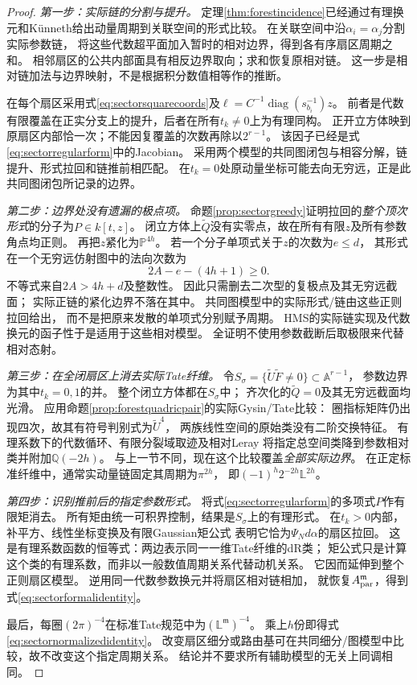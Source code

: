 \documentclass[11pt,a4paper]{ctexart}
\theoremstyle{cnplain}\newtheorem{theorem}{定理}[section]
\theoremstyle{definition}\newtheorem{definition}[theorem]{定义}
\theoremstyle{remark}\newtheorem{remark}[theorem]{注}
\begin{document}
\begin{proof}
\emph{第一步：实际链的分割与提升。}
定理\ref{thm:forestincidence}已经通过有理换元和K\"unneth给出动量周期到关联空间的形式比较。
在关联空间中沿$\alpha_i=\alpha_j$分割实际参数链，
将这些代数超平面加入暂时的相对边界，得到各有序扇区周期之和。
相邻扇区的公共内部面具有相反边界取向；求和恢复原相对链。
这一步是相对链加法与边界映射，不是根据积分数值相等作的推断。

在每个扇区采用式\eqref{eq:sectorsquarecoords}及$\ell=C^{-1}\operatorname{diag}(s_{b_i}^{-1})z$。
前者是代数有限覆盖在正实分支上的提升，后者在所有$t_k\ne0$上为有理同构。
正开立方体映到原扇区内部恰一次；不能因复覆盖的次数再除以$2^{r-1}$。
该因子已经是式\eqref{eq:sectorregularform}中的Jacobian。
采用两个模型的共同图闭包与相容分解，链提升、形式拉回和链推前相匹配。
在$t_k=0$处原动量坐标可能去向无穷远，正是此共同图闭包所记录的边界。

\emph{第二步：边界处没有遗漏的极点项。}
命题\ref{prop:sectorgreedy}证明拉回的\emph{整个顶次形式}的分子为$P\in k[t,z]$。
闭立方体上$\widetilde Q$没有实零点，故在所有有限$z$及所有参数角点均正则。
再把$z$紧化为$\mathbb P^{4h}$。
若一个分子单项式关于$z$的次数为$e\leq d$，
其形式在一个无穷远仿射图中的法向次数为
\[
 2A-e-(4h+1)\geq0.
\]
不等式来自$2A>4h+d$及整数性。
因此只需删去二次型的复极点及其无穷远截面；
实际正链的紧化边界不落在其中。
共同图模型中的实际形式/链由这些正则拉回给出，
而不是把原来发散的单项式分别赋予周期。
HMS的实际链实现及代数换元的函子性\cite{HMSMass}于是适用于这些相对模型。
全证明不使用参数截断后取极限来代替相对态射。

\emph{第三步：在全闭扇区上消去实际Tate纤维。}
令$S_\sigma=\{\widetilde U\widetilde F\ne0\}\subset\mathbb A^{r-1}$，
参数边界为其中$t_k=0,1$的并。
整个闭立方体都在$S_\sigma$中；
齐次化的$\widetilde Q=0$及其无穷远截面均光滑。
应用命题\ref{prop:forestquadricpair}的实际Gysin/Tate比较：
圈指标矩阵仍出现四次，故其有符号判别式为$\widetilde U^4$，
两族线性空间的原始类没有二阶交换特征。
有理系数下的代数循环、有限分裂域取迹及相对Leray
将指定总空间类降到参数相对类并附加$\mathbb Q(-2h)$。
与上一节不同，现在这个比较覆盖\emph{全部实际边界}。
在正定标准纤维中，通常实动量链固定其周期为$\pi^{2h}$，
即$(-1)^h2^{-2h}\mathbb L^{2h}$。

\emph{第四步：识别推前后的指定参数形式。}
将式\eqref{eq:sectorregularform}的多项式$P$作有限矩消去。
所有矩由统一可积界控制，结果是$S_\sigma$上的有理形式。
在$t_k>0$内部，补平方、线性坐标变换及有限Gaussian矩公式
表明它恰为$\Psi_Nd\alpha$的扇区拉回。
这是有理系数函数的恒等式：两边表示同一一维Tate纤维的dR类；
矩公式只是计算这个类的有理系数，而非以一般数值周期关系代替动机关系。
它因而延伸到整个正则扇区模型。
逆用同一代数参数换元并将扇区相对链相加，
就恢复$A_{\rm par}^{\mathfrak m}$，得到式\eqref{eq:sectorformalidentity}。

最后，每圈$(2\pi)^{-4}$在标准Tate规范中为$(\mathbb L^{\mathfrak m})^{-4}$。
乘上$h$份即得式\eqref{eq:sectornormalizedidentity}。
改变扇区细分或路由基可在共同细分/图模型中比较，故不改变这个指定周期关系。
结论并不要求所有辅助模型的无关上同调相同。
\end{proof}
\end{document}

